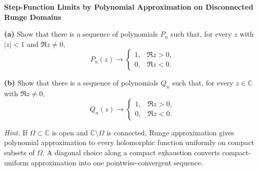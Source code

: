 \begin{problem}[CP-II-0322]
\label{prob:cp-ii-0322}
\textbf{Step-Function Limits by Polynomial Approximation on Disconnected Runge Domains}

\par\smallskip\hspace*{1.5em}\textbf{(a)}\quad
Show that there is a sequence of polynomials \(P_n\) such that, for every
\(z\) with \(|z|<1\) and \(\Re z\ne0\),
\[
P_n(z)\to
\begin{cases}
1,&\Re z>0,\\
0,&\Re z<0.
\end{cases}
\]

\par\smallskip\noindent\textbf{(b)}\quad
Show that there is a sequence of polynomials \(Q_n\) such that, for every
\(z\in\mathbb C\) with \(\Re z\ne0\),
\[
Q_n(z)\to
\begin{cases}
1,&\Re z>0,\\
0,&\Re z<0.
\end{cases}
\]

\medskip
\noindent\emph{Hint.} If \(\Omega\subset\mathbb C\) is open and \(\mathbb C\setminus\Omega\) is
connected, Runge approximation gives polynomial approximation to every
holomorphic function uniformly on compact subsets of \(\Omega\). A diagonal
choice along a compact exhaustion converts compact-uniform approximation into
one pointwise-convergent sequence.
\end{problem}

